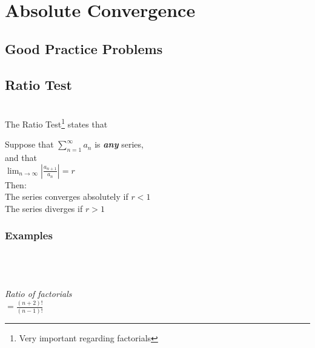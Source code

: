 \documentclass{article}
\begin{document}
\endgroup
\vspace*{\fill}

\pagebreak

\section{\centering \huge Absolute Convergence \\ }
    \subsection{Good Practice Problems}
    \subsection{Ratio Test} 
    \hrulefill \\[10pt]

    The Ratio Test\footnote{Very important regarding factorials} states that 
        
        \begingroup
        \centering
        Suppose that $\displaystyle \sum_{n=1}^{\infty} a_n$ is \textit{\textbf{any}} series,\\
        and that\\[5pt]\textbf{}
        $\displaystyle \lim_{n \rightarrow \infty} \left| \frac{a_{n+1}}{a_n} \right| = r$\\[10pt]
        Then: \\[5pt]
        The series converges absolutely if $r < 1$\\
        The series diverges if $r > 1$\\
        \endgroup

    \subsubsection{Examples}

        \begingroup
        \centering

        \\

        \hrulefill \\[10pt]

        \\[5pt]
        \textit{Ratio of factorials}\\[15pt]

        $=\frac{(n+2)!}{(n-1)!}$\\[15pt]
        
\end{document}
